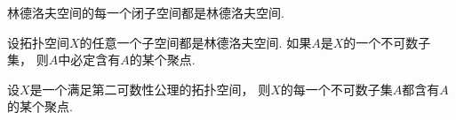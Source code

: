 \begin{theorem}
林德洛夫空间的每一个闭子空间都是林德洛夫空间.
\end{theorem}

\begin{theorem}
设拓扑空间\(X\)的任意一个子空间都是林德洛夫空间.
如果\(A\)是\(X\)的一个不可数子集，
则\(A\)中必定含有\(A\)的某个聚点.
\end{theorem}

\begin{proposition}
设\(X\)是一个满足第二可数性公理的拓扑空间，
则\(X\)的每一个不可数子集\(A\)都含有\(A\)的某个聚点.
\end{proposition}
